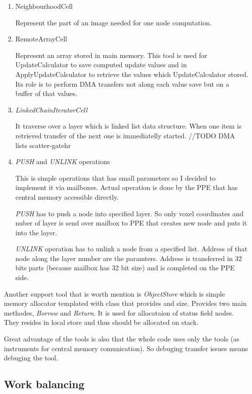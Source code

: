 \begin{enumerate}
\item NeighbourhoodCell
\par
Represent the part of an image needed for one node computation.

\item RemoteArrayCell
\par
Represent an array stored in main memory.
This tool is used for UpdateCalculator to save computed update values and in ApplyUpdateCalculator to retrieve the values which UpdateCalculator stored.
Its role is to perform DMA transfers not along each value save but on a buffer of that values.

\item \emph{LinkedChainIteratorCell}
\par
It traverse over a layer which is linked list data structure.
When one item is retrieved transfer of the next one is immediatelly started.
//TODO DMA lists scatter-gatehr

\item \emph{PUSH} and \emph{UNLINK} operations
\par
This is simple operations that has small parameters so I decided to implement it via mailboxes.
Actual operation is done by the PPE that has central memory accessible directly.
\par
\emph{PUSH} has to push a node into specified layer.
So only voxel coordinates and nuber of layer is send over mailbox to PPE that creates new node and puts it into the layer.

\par
\emph{UNLINK} operation has to unlink a node from a specified list.
Address of that node along the layer number are the paramters.
Address is transferred in 32 bits parts (because mailbox has 32 bit size) and is completed on the PPE side.
\end{enumerate}

Another support tool that is worth mention is \emph{ObjectStore} which is simple memory allocator templated with class that provides and size.
Provides two main methodes, \emph{Borrow} and \emph{Return}.
It is used for allocataion of status field nodes.
They resides in local store and thus should be allocated on stack.

Great advantage of the tools is also that the whole code uses only the tools (as instruments for central memory comunication).
So debuging transfer issues means debuging the tool.

\subsection{Work balancing}

